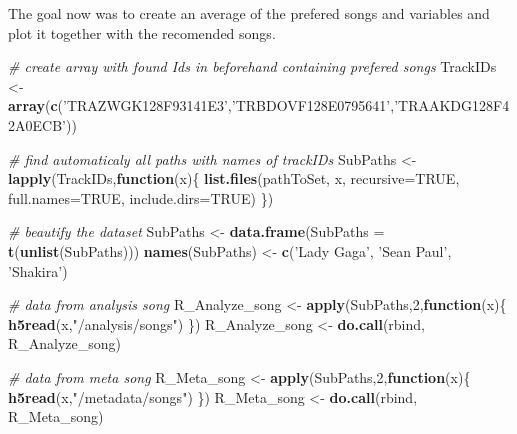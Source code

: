 \documentclass[]{article}
\newenvironment{Shaded}{\begin{snugshade}}{\end{snugshade}}
\newcommand{\KeywordTok}[1]{\textcolor[rgb]{0.13,0.29,0.53}{\textbf{#1}}}
\newcommand{\DataTypeTok}[1]{\textcolor[rgb]{0.13,0.29,0.53}{#1}}
\newcommand{\DecValTok}[1]{\textcolor[rgb]{0.00,0.00,0.81}{#1}}
\newcommand{\StringTok}[1]{\textcolor[rgb]{0.31,0.60,0.02}{#1}}
\newcommand{\CommentTok}[1]{\textcolor[rgb]{0.56,0.35,0.01}{\textit{#1}}}
\newcommand{\OtherTok}[1]{\textcolor[rgb]{0.56,0.35,0.01}{#1}}
\newcommand{\ControlFlowTok}[1]{\textcolor[rgb]{0.13,0.29,0.53}{\textbf{#1}}}
\newcommand{\NormalTok}[1]{#1}
\begin{document}
The goal now was to create an average of the prefered songs and
variables and plot it together with the recomended songs.

\begin{Shaded}
\begin{Highlighting}[]
\CommentTok{# create array with found Ids in beforehand containing prefered songs}
\NormalTok{TrackIDs <-}\StringTok{ }\KeywordTok{array}\NormalTok{(}\KeywordTok{c}\NormalTok{(}\StringTok{'TRAZWGK128F93141E3'}\NormalTok{,}\StringTok{'TRBDOVF128E0795641'}\NormalTok{,}\StringTok{'TRAAKDG128F42A0ECB'}\NormalTok{))}

\CommentTok{# find automaticaly all paths with names of trackIDs}
\NormalTok{SubPaths <-}\StringTok{ }\KeywordTok{lapply}\NormalTok{(TrackIDs,}\ControlFlowTok{function}\NormalTok{(x)\{}
  \KeywordTok{list.files}\NormalTok{(pathToSet, x, }\DataTypeTok{recursive=}\OtherTok{TRUE}\NormalTok{, }\DataTypeTok{full.names=}\OtherTok{TRUE}\NormalTok{, }\DataTypeTok{include.dirs=}\OtherTok{TRUE}\NormalTok{)}
\NormalTok{\})}

\CommentTok{# beautify the dataset }
\NormalTok{SubPaths <-}\StringTok{ }\KeywordTok{data.frame}\NormalTok{(}\DataTypeTok{SubPaths =} \KeywordTok{t}\NormalTok{(}\KeywordTok{unlist}\NormalTok{(SubPaths)))}
\KeywordTok{names}\NormalTok{(SubPaths) <-}\StringTok{ }\KeywordTok{c}\NormalTok{(}\StringTok{'Lady Gaga'}\NormalTok{, }\StringTok{'Sean Paul'}\NormalTok{, }\StringTok{'Shakira'}\NormalTok{)}

\CommentTok{# data from analysis song}
\NormalTok{R_Analyze_song <-}\StringTok{ }\KeywordTok{apply}\NormalTok{(SubPaths,}\DecValTok{2}\NormalTok{,}\ControlFlowTok{function}\NormalTok{(x)\{}
  \KeywordTok{h5read}\NormalTok{(x,}\StringTok{"/analysis/songs"}\NormalTok{)}
\NormalTok{\})}
\NormalTok{R_Analyze_song <-}\StringTok{ }\KeywordTok{do.call}\NormalTok{(rbind, R_Analyze_song)}

\CommentTok{# data from meta song}
\NormalTok{R_Meta_song <-}\StringTok{ }\KeywordTok{apply}\NormalTok{(SubPaths,}\DecValTok{2}\NormalTok{,}\ControlFlowTok{function}\NormalTok{(x)\{}
  \KeywordTok{h5read}\NormalTok{(x,}\StringTok{"/metadata/songs"}\NormalTok{)}
\NormalTok{\})}
\NormalTok{R_Meta_song <-}\StringTok{ }\KeywordTok{do.call}\NormalTok{(rbind, R_Meta_song)}


\end{Highlighting}
\end{Shaded}
\end{document}
